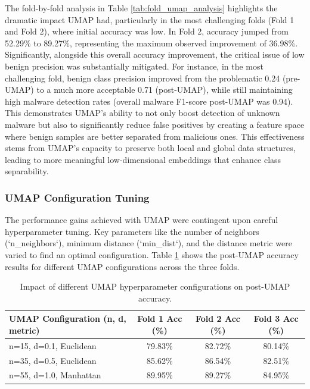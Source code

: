 The fold-by-fold analysis in Table \ref{tab:fold_umap_analysis} highlights the dramatic impact UMAP had, particularly in the most challenging folds (Fold 1 and Fold 2), where initial accuracy was low. In Fold 2, accuracy jumped from 52.29\% to 89.27\%, representing the maximum observed improvement of 36.98\%. Significantly, alongside this overall accuracy improvement, the critical issue of low benign precision was substantially mitigated. For instance, in the most challenging fold, benign class precision improved from the problematic 0.24 (pre-UMAP) to a much more acceptable 0.71 (post-UMAP), while still maintaining high malware detection rates (overall malware F1-score post-UMAP was 0.94). This demonstrates UMAP's ability to not only boost detection of unknown malware but also to significantly reduce false positives by creating a feature space where benign samples are better separated from malicious ones. This effectiveness stems from UMAP's capacity to preserve both local and global data structures, leading to more meaningful low-dimensional embeddings that enhance class separability.

\subsubsection{UMAP Configuration Tuning}
\label{subsubsec:umap_config}

The performance gains achieved with UMAP were contingent upon careful hyperparameter tuning. Key parameters like the number of neighbors (`n_neighbors`), minimum distance (`min_dist`), and the distance metric were varied to find an optimal configuration. Table \ref{tab:umap_config_analysis} shows the post-UMAP accuracy results for different UMAP configurations across the three folds.

\begin{table}[h!]
  \centering
  \captionsetup{labelformat=empty, textformat=simple}
  \caption{TABLE VII: UMAP CONFIGURATION ANALYSIS}
  \label{tab:umap_config_analysis}
  \begin{tabular}{lccc}
    \toprule
    \textbf{UMAP Configuration (n, d, metric)} & \textbf{Fold 1 Acc (\%)} & \textbf{Fold 2 Acc (\%)} & \textbf{Fold 3 Acc (\%)} \\
    \midrule
    n=15, d=0.1, Euclidean  & 79.83\% & 82.72\% & 80.14\% \\
    n=35, d=0.5, Euclidean  & 85.62\% & 86.54\% & 82.51\% \\
    n=55, d=1.0, Manhattan & 89.95\% & 89.27\% & 84.95\% \\
    \bottomrule
  \end{tabular}
  \vspace{0.2cm} %
  \caption*{Impact of different UMAP hyperparameter configurations on post-UMAP accuracy.} %
\end{table}


